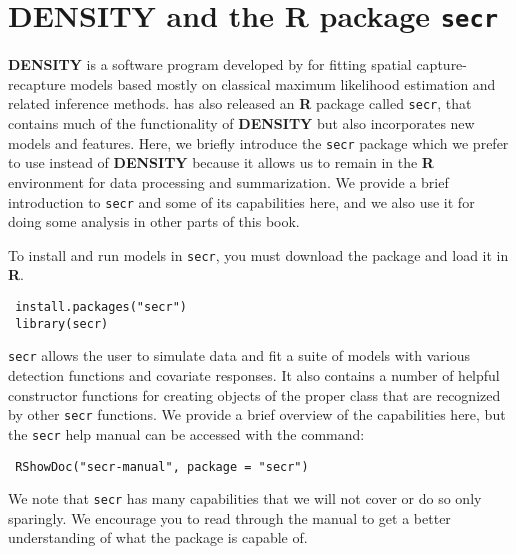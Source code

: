 \begin{comment}
\subsection{
Exercises
}

{\flushleft
1.	Compute the 95\% confidence interval for wolverine density,
somehow. Comment on the practical implication of this level of precision.
}

{\flushleft
2.	Compute the AIC of this model and modify \mbox{\tt intlik3}
 to consider alternative link functions (at least one additional) and
 compare the  AIC of the different models and the estimates. Comment. 
}
\end{comment}


\section{DENSITY and the R package \mbox{\tt secr} }
\label{mle.sec.secr}

{\bf DENSITY} is a software program developed by \citet{efford:2004}
for fitting spatial capture-recapture models based mostly on classical
maximum likelihood estimation and related inference methods.
\citet{efford:2011} has also released an {\bf R} package called
\mbox{\tt secr}, that contains much of the functionality of {\bf
  DENSITY} but also incorporates new models and features.  Here, we
briefly introduce the \mbox{\tt secr} package which we prefer to use
instead of {\bf DENSITY} because it allows us to remain in the {\bf R}
environment for data processing and summarization. We provide a brief
introduction to \mbox{\tt secr} and some of its capabilities here, and
we also use it for doing some analysis in other parts of this book.

To install
and run models in \mbox{\tt secr}, you must download the package and
load it in
{\bf R}.
\begin{verbatim}
 install.packages("secr")
 library(secr)
\end{verbatim}
\mbox{\tt secr} allows the user to simulate data and fit a suite of models with
various detection functions and covariate responses. It also contains
a number of helpful constructor functions for creating objects of the
proper class that are recognized by other \mbox{\tt secr}
functions. We provide a brief overview of the capabilities here, but
the \mbox{\tt secr} help manual can be accessed with the command:
\begin{verbatim}
 RShowDoc("secr-manual", package = "secr")
\end{verbatim}
We note that \mbox{\tt secr} has many capabilities that we will not
cover or do so only sparingly. We encourage you to read through the
manual to get a better understanding of what the package is capable of.

